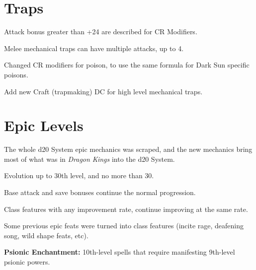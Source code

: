 \section{Traps}
\begin{itemize*}
\item Attack bonus greater than +24 are described for CR Modifiers.
\item Melee mechanical traps can have multiple attacks, up to 4.
\item Changed CR modifiers for poison, to use the same formula for {\tableheader Dark Sun} specific poisons.
\item Add new Craft (trapmaking) DC for high level mechanical traps.
\end{itemize*}

\section{Epic Levels}
The whole d20 System epic mechanics was scraped, and the new mechanics bring most of what was in \emph{Dragon Kings} into the d20 System.

\begin{itemize*}
\item Evolution up to 30th level, and no more than 30.
\item Base attack and save bonuses continue the normal progression.
\item Class features with any improvement rate, continue improving at the same rate.
\item Some previous epic feats were turned into class features (incite rage, deafening song, wild shape feats, etc).
\item \textbf{Psionic Enchantment:} 10th-level spells that require manifesting 9th-level psionic powers.
\end{itemize*}
